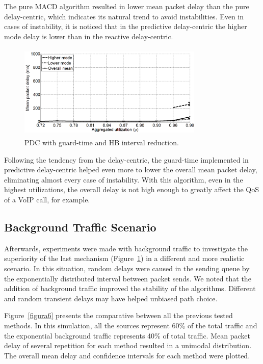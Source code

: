 \documentclass[letterpaper,10pt,oneside,conference,final]{sbrt2015}
\begin{document}
The pure MACD algorithm resulted in lower mean packet delay than the pure delay-centric, which indicates its natural trend to avoid instabilities. Even in cases of instability, it is noticed that in the predictive delay-centric the higher mode delay is lower than in the reactive delay-centric.

\begin{figure}[h!]
\centering
\includegraphics[width=8.8cm,height=4.5cm]{figura5}
\caption{PDC with guard-time and HB interval reduction.}
\label{figura5}
\end{figure}

Following the tendency from the delay-centric, the guard-time implemented in predictive delay-centric helped even more to lower the overall mean packet delay, eliminating almost every case of instability. With this algorithm, even in the highest utilizations, the overall delay is not high enough to greatly affect the QoS of a VoIP call, for example.

\subsection{Background Traffic Scenario}
Afterwards, experiments were made with background traffic to investigate the superiority of the last mechanism (Figure~\ref{figura5})  in a different and more realistic scenario. In this situation, random delays were caused in the sending queue by the exponentially distributed interval between packet sends. We noted that the addition of background traffic improved the stability of the algorithms. Different and random transient delays may have helped unbiased path choice.

Figure~\ref{figura6} presents the comparative between all the previous tested methods. In this simulation, all the sources represent 60\% of the total traffic and the exponential background traffic represents 40\% of total traffic. Mean packet delay of several repetition for each method resulted in a unimodal distribution. The overall mean delay and confidence intervals for each method were plotted.
\end{document}
